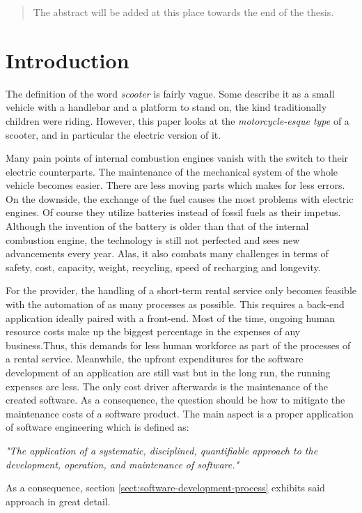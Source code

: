 \documentclass[12pt,a4paper,twoside]{report}
\begin{document}



\begin{abstract}

The abstract will be added at this place towards the end of the thesis.

\end{abstract}


\tableofcontents



\chapter{Introduction} \label{chap:intro}



The definition of the word \emph{scooter} is fairly vague.
Some describe it as a small vehicle with a handlebar and a platform to stand on,
the kind traditionally children were riding.
However, this paper looks at the \emph{motorcycle-esque type} of a scooter, and in
particular the electric version of it.

Many pain points of internal combustion engines vanish with the switch to their electric
counterparts. The maintenance of the mechanical system of the whole vehicle becomes easier.
There are less moving parts which makes for less errors.
On the downside, the exchange of the fuel causes the most problems with electric engines.
Of course they utilize batteries instead of fossil fuels as their impetus.
Although the invention of the battery is older than that of the
internal combustion engine\cn, the technology is still not perfected and sees new
advancements every year. Alas, it also combats many challenges in terms of
safety, cost, capacity, weight, recycling, speed of recharging and longevity.

For the provider, the handling of a short-term rental service
only becomes feasible with the automation of as many processes as possible.
This requires a back-end application ideally paired with a front-end.
Most of the time, ongoing human resource costs make up the biggest percentage
in the expenses of any business.\cn Thus, this demands for less human workforce
as part of the processes of a rental service.
Meanwhile, the upfront expenditures for the software development of
an application are still vast but in the long run, the running expenses are less.
The only cost driver afterwards is the maintenance of the created software.
As a consequence, the question should be how to mitigate the maintenance costs
of a software product. The main aspect is a proper application of
software engineering which is defined as:
\begin{displayquote}
\emph{"The application of a systematic, disciplined, quantifiable approach to the
development, operation, and maintenance of software."}~\cite{se-ieee}
\end{displayquote}
As a consequence, section \ref{sect:software-development-process} exhibits
said approach in great detail.
\end{document}
